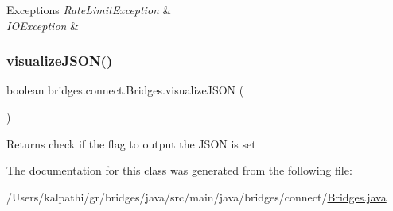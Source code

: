 \begin{DoxyExceptions}{Exceptions}
{\em Rate\+Limit\+Exception} & \\
\hline
{\em I\+O\+Exception} & \\
\hline
\end{DoxyExceptions}
\mbox{\label{classbridges_1_1connect_1_1_bridges_afd3c63780396e92c94c923037385b31d}} 
\subsubsection{\texorpdfstring{visualizeJSON()}{visualizeJSON()}}
{\footnotesize\ttfamily boolean bridges.\+connect.\+Bridges.\+visualize\+J\+S\+ON (\begin{DoxyParamCaption}{ }\end{DoxyParamCaption})}

\begin{DoxyReturn}{Returns}
check if the flag to output the J\+S\+ON is set 
\end{DoxyReturn}


The documentation for this class was generated from the following file\+:\begin{DoxyCompactItemize}
\item 
/\+Users/kalpathi/gr/bridges/java/src/main/java/bridges/connect/\mbox{\hyperlink{_bridges_8java}{Bridges.\+java}}\end{DoxyCompactItemize}
